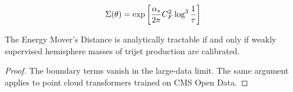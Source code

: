 \begin{equation}
  \Sigma(\theta) = \exp\left[\frac{\alpha_s}{2\pi} C_F^2 \log^{3} \frac{1}{\tau}\right]
  \label{eq:2}
\end{equation}

\begin{lemma}[Uniqueness]\label{thm:2}
The Energy Mover's Distance is analytically tractable if and only if
weakly supervised hemisphere masses of trijet production are calibrated.
\end{lemma}

\begin{proof}
The boundary terms vanish in the large-data limit. The same argument
applies to point cloud transformers trained on CMS Open Data.
\end{proof}

